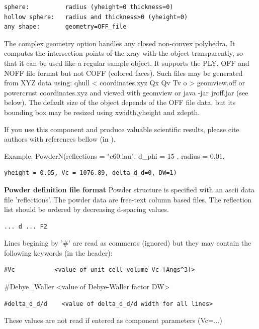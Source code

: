 \begin{verbatim}
sphere:          radius (yheight=0 thickness=0)
hollow sphere:   radius and thickness>0 (yheight=0)
any shape:       geometry=OFF_file
\end{verbatim}

The complex geometry option handles any closed non-convex polyhedra. It computes the intersection points of the xray with the object transparently, so that it can be used like a regular sample object. It supports the PLY, OFF and NOFF file format but not COFF (colored faces). Such files may be generated from XYZ data using: qhull \textless{} coordinates.xyz Qx Qv Tv o \textgreater{} geomview.off or powercrust coordinates.xyz and viewed with geomview or java -jar jroff.jar (see below). The default size of the object depends of the OFF file data, but its bounding box may be resized using xwidth,yheight and zdepth.

If you use this component and produce valuable scientific results, please cite authors with references bellow (in ).

Example: PowderN(reflections = "c60.lau", d\_phi = 15 , radius = 0.01,

\begin{verbatim}
yheight = 0.05, Vc = 1076.89, delta_d_d=0, DW=1)
\end{verbatim}

\textbf{Powder definition file format} Powder structure is specified with an ascii data file 'reflections'. The powder data are free-text column based files. The reflection list should be ordered by decreasing d-spacing values.

\begin{verbatim}
... d ... F2
\end{verbatim}

Lines begining by '\#' are read as comments (ignored) but they may contain the following keywords (in the header):

\begin{verbatim}
#Vc           <value of unit cell volume Vc [Angs^3]>
\end{verbatim}

\#Debye\_Waller \textless{}value of Debye-Waller factor DW\textgreater{}

\begin{verbatim}
#delta_d_d/d    <value of delta_d_d/d width for all lines>
\end{verbatim}

These values are not read if entered as component parameters (Vc=...)

